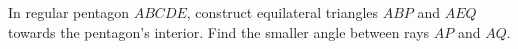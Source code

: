 In regular pentagon $ABCDE$, construct equilateral triangles $ABP$ and $AEQ$ towards the pentagon's interior. Find the smaller angle between rays $AP$ and $AQ$.
